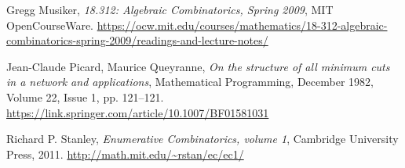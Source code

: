 \documentclass[numbers=enddot,12pt,final,onecolumn,notitlepage]{scrartcl}%
\theoremstyle{definition}
\begin{document}
\begin{thebibliography}{99999999}
Gregg Musiker,
\textit{18.312: Algebraic Combinatorics, Spring 2009},
MIT OpenCourseWare.
\newline\url{https://ocw.mit.edu/courses/mathematics/18-312-algebraic-combinatorics-spring-2009/readings-and-lecture-notes/}

Jean-Claude Picard, Maurice Queyranne,
\textit{On the structure of all minimum cuts in a network and applications},
Mathematical Programming,
December 1982, Volume 22, Issue 1, pp. 121--121.
\newline\url{https://link.springer.com/article/10.1007/BF01581031}

Richard P. Stanley, \textit{Enumerative
Combinatorics, volume 1}, Cambridge University Press, 2011. \newline%
\url{http://math.mit.edu/~rstan/ec/ec1/}

\end{thebibliography}
\end{document}
